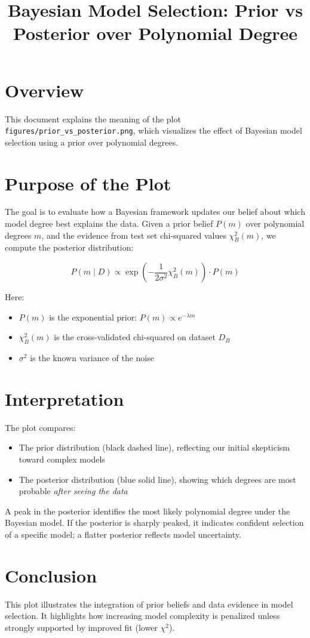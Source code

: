 \documentclass{article}
\title{Bayesian Model Selection: Prior vs Posterior over Polynomial Degree}
\author{}
\date{}
\begin{document}
\maketitle

\section*{Overview}

This document explains the meaning of the plot \texttt{figures/prior\_vs\_posterior.png}, which visualizes the effect of Bayesian model selection using a prior over polynomial degrees.

\section*{Purpose of the Plot}

The goal is to evaluate how a Bayesian framework updates our belief about which model degree best explains the data. Given a prior belief \( P(m) \) over polynomial degrees \( m \), and the evidence from test set chi-squared values \( \chi^2_B(m) \), we compute the posterior distribution:

\[
P(m \mid D) \propto \exp\left( -\frac{1}{2\sigma^2} \chi^2_B(m) \right) \cdot P(m)
\]

Here:
\begin{itemize}
  \item \( P(m) \) is the exponential prior: \( P(m) \propto e^{-\lambda m} \)
  \item \( \chi^2_B(m) \) is the cross-validated chi-squared on dataset \( D_B \)
  \item \( \sigma^2 \) is the known variance of the noise
\end{itemize}

\section*{Interpretation}

The plot compares:
\begin{itemize}
  \item The prior distribution (black dashed line), reflecting our initial skepticism toward complex models
  \item The posterior distribution (blue solid line), showing which degrees are most probable \emph{after seeing the data}
\end{itemize}

A peak in the posterior identifies the most likely polynomial degree under the Bayesian model. If the posterior is sharply peaked, it indicates confident selection of a specific model; a flatter posterior reflects model uncertainty.

\section*{Conclusion}

This plot illustrates the integration of prior beliefs and data evidence in model selection. It highlights how increasing model complexity is penalized unless strongly supported by improved fit (lower \( \chi^2 \)).
\end{document}
